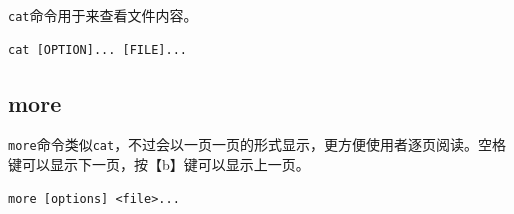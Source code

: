\documentclass[12pt, openany, oneside]{book}
\begin{document}
\lstinline|cat|命令用于来查看文件内容。

\vspace{-0.5cm}
\begin{lstlisting}
cat [OPTION]... [FILE]...
\end{lstlisting}

\begin{table}[H]
    \centering
    \caption{\lstinline|cat|参数说明}
\end{table}

\subsection{more}

\lstinline|more|命令类似\lstinline|cat|，不过会以一页一页的形式显示，更方便使用者逐页阅读。空格键可以显示下一页，按【b】键可以显示上一页。

\vspace{-0.5cm}
\begin{lstlisting}
more [options] <file>...
\end{lstlisting}
\end{document}
